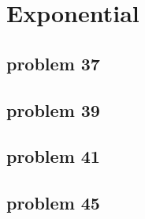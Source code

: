\section{Exponential}

\subsection{problem 37}

\subsection{problem 39}

\subsection{problem 41}

\subsection{problem 45}

